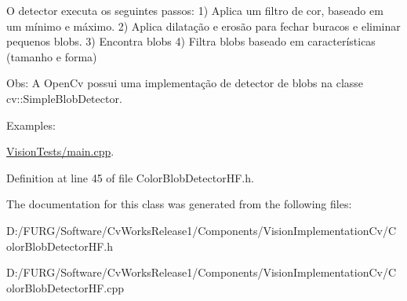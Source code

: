 O detector executa os seguintes passos\+: 1) Aplica um filtro de cor, baseado em um mínimo e máximo. 2) Aplica dilatação e erosão para fechar buracos e eliminar pequenos blobs. 3) Encontra blobs 4) Filtra blobs baseado em características (tamanho e forma)

Obs\+: A Open\+Cv possui uma implementação de detector de blobs na classe cv\+::\+Simple\+Blob\+Detector. \begin{Desc}
\item[Examples\+: ]\par
\hyperlink{_vision_tests_2main_8cpp-example}{Vision\+Tests/main.\+cpp}.\end{Desc}


Definition at line 45 of file Color\+Blob\+Detector\+H\+F.\+h.



The documentation for this class was generated from the following files\+:\begin{DoxyCompactItemize}
\item 
D\+:/\+F\+U\+R\+G/\+Software/\+Cv\+Works\+Release1/\+Components/\+Vision\+Implementation\+Cv/Color\+Blob\+Detector\+H\+F.\+h\item 
D\+:/\+F\+U\+R\+G/\+Software/\+Cv\+Works\+Release1/\+Components/\+Vision\+Implementation\+Cv/Color\+Blob\+Detector\+H\+F.\+cpp\end{DoxyCompactItemize}
